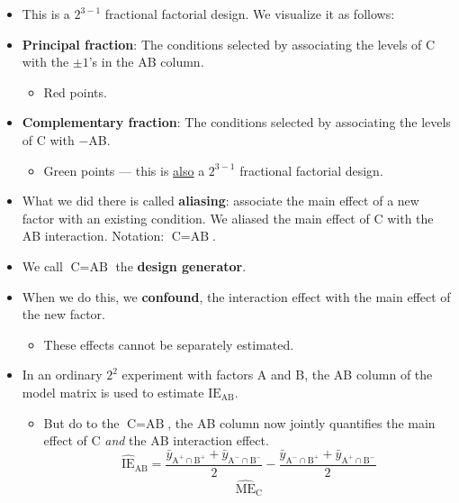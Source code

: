 \begin{itemize}
    \item This is a $ 2^{3-1} $ fractional factorial design. We visualize it as follows:
    \item \textbf{Principal fraction}: The conditions selected by associating the levels of C with the $±1$'s in the AB
          column.
          \begin{itemize}[label={}]
              \item Red points.
          \end{itemize}
    \item \textbf{Complementary fraction}: The conditions selected by associating the levels of C with $ - $AB\@.
          \begin{itemize}[label={}]
              \item Green points --- this is \underline{also} a $ 2^{3-1} $ fractional factorial design.
          \end{itemize}
    \item What we did there is called \textbf{aliasing}: associate the main effect of a new
          factor with an existing condition. We aliased the main effect of C with the AB interaction.
          Notation: $ \text{C}=\text{AB} $.
    \item We call $ \text{C}=\text{AB} $ the \textbf{design generator}.
    \item When we do this, we \textbf{confound}, the interaction effect with the main effect of the new factor.
          \begin{itemize}[$\hookrightarrow$]
              \item These effects cannot be separately estimated.
          \end{itemize}
    \item In an ordinary $2^2$ experiment with factors A and B, the AB column of the model matrix is used to
          estimate $ \text{IE}_{\text{AB}} $.
          \begin{itemize}
              \item But do to the $ \text{C}=\text{AB} $, the AB column now jointly quantifies the main effect of C \emph{and}
                    the AB interaction effect.
                    \[ \widehat{\text{IE}}_{\text{AB}}
                        =\frac{\bar{y}_{\text{A}^+\cap \text{B}^+}+\bar{y}_{\text{A}^-\cap \text{B}^-}}{2}-\frac{\bar{y}_{\text{A}^-\cap \text{B}^+}+\bar{y}_{\text{A}^+\cap \text{B}^-}}{2} \]
                    \begin{align}
                        \widehat{\text{ME}}_{\text{C}}

\end{align}
\end{itemize}
\end{itemize}
